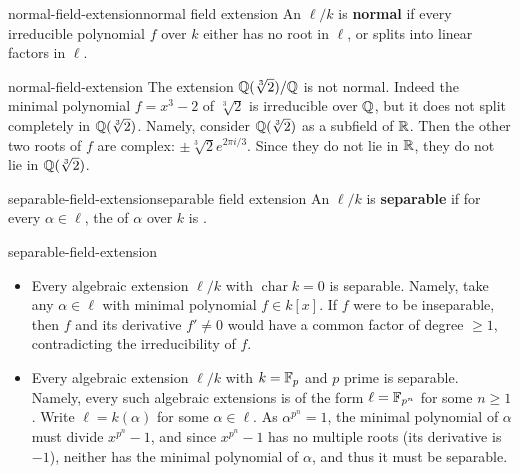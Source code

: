 \begin{topic}{normal-field-extension}{normal field extension}
    An  $\ell/k$ is \textbf{normal} if every irreducible polynomial $f$ over $k$ either has no root in $\ell$, or splits into linear factors in $\ell$.
\end{topic}

\begin{example}{normal-field-extension}
    The extension $\mathbb{Q}(\sqrt[3]{2}) / \mathbb{Q}$ is not normal. Indeed the minimal polynomial $f = x^3 - 2$ of $\sqrt[3]{2}$ is irreducible over $\mathbb{Q}$, but it does not split completely in $\mathbb{Q}(\sqrt[3]{2})$. Namely, consider $\mathbb{Q}(\sqrt[3]{2})$ as a subfield of $\mathbb{R}$. Then the other two roots of $f$ are complex: $\pm \sqrt[3]{2} e^{2 \pi i / 3}$. Since they do not lie in $\mathbb{R}$, they do not lie in $\mathbb{Q}(\sqrt[3]{2})$.
\end{example}

\begin{topic}{separable-field-extension}{separable field extension}
    An   $\ell/k$ is \textbf{separable} if for every $\alpha \in \ell$, the  of $\alpha$ over $k$ is .
\end{topic}

\begin{example}{separable-field-extension}
\begin{itemize}
    \item Every algebraic extension $\ell/k$ with $\operatorname{char} k = 0$ is separable. Namely, take any $\alpha \in \ell$ with minimal polynomial $f \in k[x]$. If $f$ were to be inseparable, then $f$ and its derivative $f' \ne 0$ would have a common factor of degree $\ge 1$, contradicting the irreducibility of $f$. 
    \item Every algebraic extension $\ell/k$ with $k = \mathbb{F}_p$ and $p$ prime is separable. Namely, every such algebraic extensions is of the form $\ell = \mathbb{F}_{p^n}$ for some $n \ge 1$. Write $\ell = k(\alpha)$ for some $\alpha \in \ell$. As $\alpha^{p^n} = 1$, the minimal polynomial of $\alpha$ must divide $x^{p^n} - 1$, and since $x^{p^n} - 1$ has no multiple roots (its derivative is $-1$), neither has the minimal polynomial of $\alpha$, and thus it must be separable.
\end{itemize}
\end{example}

